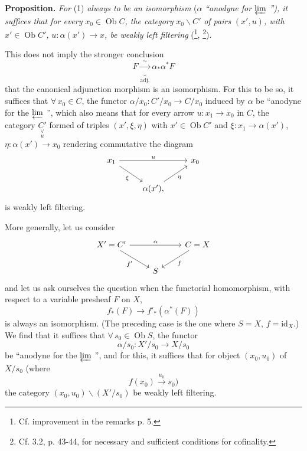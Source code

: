\documentclass[11pt]{article}
\newcommand{\printedpage}[1]{\marginpar{\footnotesize p.~#1}}
\newcommand{\msp}[1]{\marginpar{\footnotesize [#1]}}
\newcommand{\Vcat}[2]{\underset{#2}{\underset{\vee}{#1}}}
\begin{document}
\textbf{Proposition.} \textit{For} (1) \textit{always to be an isomorphism} ($\alpha$ \textit{``anodyne for} $\varprojlim$ \textit{''), it suffices that for every} $x_0 \in \operatorname{Ob} C$\textit{, the category} $x_0\backslash C'$ \textit{of pairs} $(x', u)$\textit{, with} $x' \in \operatorname{Ob} C'$\textit{,} $u : \alpha(x') \longrightarrow x$\textit{, be weakly left filtering} (\footnote{Cf. improvement in the remarks p. 5.}, \footnote{Cf. 3.2, p. 43-44, for necessary and sufficient conditions for cofinality.}). %

This does not imply the stronger conclusion
\[ F \underbrace{\xrightarrow{\;\sim\;}}_{\text{adj.}} \alpha_*\alpha^* F \]
that the canonical adjunction morphism is an isomorphism. For this to be so, it suffices that $\forall\, x_0 \in C$, the functor $\alpha/x_0 : C'/x_0 \longrightarrow C/x_0$ induced by $\alpha$ be ``anodyne for the $\varprojlim$ '', which also means that for every arrow $u : x_1 \longrightarrow x_0$ in $C$, the category $\Vcat{C'}{u}$ formed of triples $(x', \xi, \eta)$ with $x' \in \operatorname{Ob} C'$ and $\xi : x_1 \longrightarrow \alpha(x')$, $\eta : \alpha(x') \longrightarrow x_0$ rendering commutative
\msp{page 2}
the diagram
\printedpage{2}
\[
\begin{tikzcd}
x_1 \arrow[rr, "u"] \arrow[dr, "\xi"'] & & x_0 \\
 & \alpha(x'), \arrow[ur, "\eta"'] &
\end{tikzcd}
\]
is weakly left filtering.

More generally, let us consider
\[
\begin{tikzcd}
X' = C' \arrow[rr, "\alpha"] \arrow[dr, "f'"'] & & C = X \arrow[dl, "f"] \\
 & S &
\end{tikzcd}
\]
and let us ask ourselves the question when the functorial homomorphism, with respect to a variable presheaf $F$ on $X$,
\[ f_*(F) \longrightarrow f'_*(\alpha^*(F)) \]
is always an isomorphism. (The preceding case is the one where $S = X$, $f = \mathrm{id}_X$.) We find that it suffices that $\forall\, s_0 \in \operatorname{Ob} S$, the functor
\[ \alpha/s_0 : X'/s_0 \longrightarrow X/s_0 \]
be ``anodyne for the $\varprojlim$ '', and for this, it suffices that for object $(x_0, u_0)$ of $X/s_0$ (where
\[ f(x_0) \xrightarrow{u_0} s_0) \]
the category $(x_0, u_0)\backslash(X'/s_0)$ be weakly left filtering.
\end{document}
